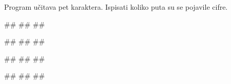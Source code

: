 \begin{Exercise}[label=p1.7_] 
Program učitava pet karaktera. Ispisati koliko
puta su se pojavile cifre. 

\begin{miditest}
\begin{upotreba}{1}
#\naslovInt#
##
##
\end{upotreba}
\end{miditest}
\begin{miditest}
\begin{upotreba}{2}
#\naslovInt#
##
##
\end{upotreba}
\end{miditest}

\begin{miditest}
\begin{upotreba}{3}
#\naslovInt#
##
##
\end{upotreba}
\end{miditest}
\begin{miditest}
\begin{upotreba}{4}
#\naslovInt#
##
##
\end{upotreba}
\end{miditest}
\end{Exercise}
\begin{Answer}[ref=p1.7_]
\end{Answer}





